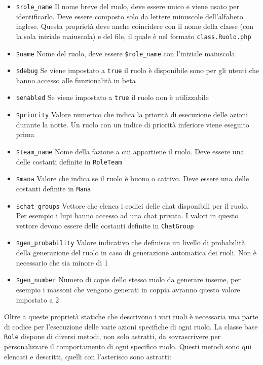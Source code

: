 \begin{itemize}[noitemsep,nolistsep]
	\item \texttt{\$role\_name} Il nome breve del ruolo, deve essere unico e viene usato per identificarlo. Deve essere composto solo da lettere minuscole dell'alfabeto inglese. Questa proprietà deve anche coincidere con il nome della classe (con la sola iniziale maiuscola) e del file, il quale è nel formato \texttt{class.Ruolo.php}
	\item \texttt{\$name} Nome del ruolo, deve essere \texttt{\$role\_name} con l'iniziale maiuscola
	\item \texttt{\$debug} Se viene impostato a \texttt{true} il ruolo è disponibile sono per gli utenti che hanno accesso alle funzionalità in beta
	\item \texttt{\$enabled} Se viene impostato a \texttt{true} il ruolo non è utilizzabile
	\item \texttt{\$priority} Valore numerico che indica la priorità di esecuzione delle azioni durante la notte. Un ruolo con un indice di priorità inferiore viene eseguito prima
	\item \texttt{\$team\_name} Nome della fazione a cui appartiene il ruolo. Deve essere una delle costanti definite in \texttt{RoleTeam}
	\item \texttt{\$mana} Valore che indica se il ruolo è buono o cattivo. Deve essere una delle costanti definite in \texttt{Mana}
	\item \texttt{\$chat\_groups} Vettore che elenca i codici delle chat disponibili per il ruolo. Per esempio i lupi hanno accesso ad una chat privata. I valori in questo vettore devono essere delle costanti definite in \texttt{ChatGroup}
	\item \texttt{\$gen\_probability} Valore indicativo che definisce un livello di probabilità della generazione del ruolo in caso di generazione automatica dei ruoli. Non è necessario che sia minore di 1
	\item \texttt{\$gen\_number} Numero di copie dello stesso ruolo da generare inseme, per esempio i massoni che vengono generati in coppia avranno questo valore impostato a 2
\end{itemize}

\vspace{0.7em}
Oltre a queste proprietà statiche che descrivono i vari ruoli è necessaria una parte di codice per l'esecuzione delle varie azioni specifiche di ogni ruolo. La classe base \texttt{Role} dispone di diversi metodi, non solo astratti, da sovrascrivere per personalizzare il comportamento di ogni specifico ruolo. Questi metodi sono qui elencati e descritti, quelli con l'asterisco sono astratti:

